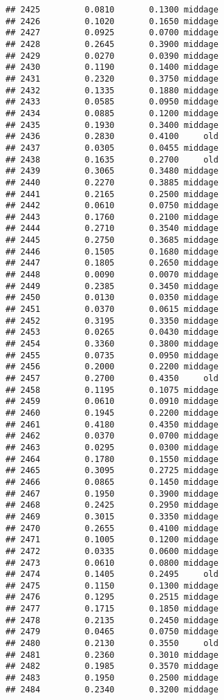 \documentclass[
]{article}
\begin{document}
\begin{verbatim}
## 2425         0.0810       0.1300 middage
## 2426         0.1020       0.1650 middage
## 2427         0.0925       0.0700 middage
## 2428         0.2645       0.3900 middage
## 2429         0.0270       0.0390 middage
## 2430         0.1190       0.1400 middage
## 2431         0.2320       0.3750 middage
## 2432         0.1335       0.1880 middage
## 2433         0.0585       0.0950 middage
## 2434         0.0885       0.1200 middage
## 2435         0.1930       0.3400 middage
## 2436         0.2830       0.4100     old
## 2437         0.0305       0.0455 middage
## 2438         0.1635       0.2700     old
## 2439         0.3065       0.3480 middage
## 2440         0.2270       0.3885 middage
## 2441         0.2165       0.2500 middage
## 2442         0.0610       0.0750 middage
## 2443         0.1760       0.2100 middage
## 2444         0.2710       0.3540 middage
## 2445         0.2750       0.3685 middage
## 2446         0.1505       0.1680 middage
## 2447         0.1805       0.2650 middage
## 2448         0.0090       0.0070 middage
## 2449         0.2385       0.3450 middage
## 2450         0.0130       0.0350 middage
## 2451         0.0370       0.0615 middage
## 2452         0.3195       0.3350 middage
## 2453         0.0265       0.0430 middage
## 2454         0.3360       0.3800 middage
## 2455         0.0735       0.0950 middage
## 2456         0.2000       0.2200 middage
## 2457         0.2700       0.4350     old
## 2458         0.1195       0.1075 middage
## 2459         0.0610       0.0910 middage
## 2460         0.1945       0.2200 middage
## 2461         0.4180       0.4350 middage
## 2462         0.0370       0.0700 middage
## 2463         0.0295       0.0300 middage
## 2464         0.1780       0.1550 middage
## 2465         0.3095       0.2725 middage
## 2466         0.0865       0.1450 middage
## 2467         0.1950       0.3900 middage
## 2468         0.2425       0.2950 middage
## 2469         0.3015       0.3350 middage
## 2470         0.2655       0.4100 middage
## 2471         0.1005       0.1200 middage
## 2472         0.0335       0.0600 middage
## 2473         0.0610       0.0800 middage
## 2474         0.1405       0.2495     old
## 2475         0.1150       0.1300 middage
## 2476         0.1295       0.2515 middage
## 2477         0.1715       0.1850 middage
## 2478         0.2135       0.2450 middage
## 2479         0.0465       0.0750 middage
## 2480         0.2130       0.3550     old
## 2481         0.2360       0.3010 middage
## 2482         0.1985       0.3570 middage
## 2483         0.1950       0.2500 middage
## 2484         0.2340       0.3200 middage

\end{verbatim}
\end{document}
